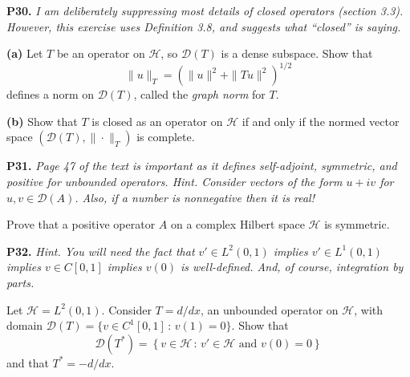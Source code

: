 \documentclass[12pt]{amsart}
\newcommand{\cD}{\mathcal{D}}
\newcommand{\cH}{\mathcal{H}}
\newcommand{\prob}[1]{\bigskip\noindent\textbf{#1.}\quad }
\newcommand{\epart}[1]{\medskip\noindent\textbf{(#1)}\quad }
\begin{document}
\prob{P30} \emph{I am deliberately suppressing most details of \emph{closed} operators (section 3.3).  However, this exercise uses Definition 3.8, and suggests what ``closed'' is saying.}

\epart{a} Let $T$ be an operator on $\cH$, so $\cD(T)$ is a dense subspace.  Show that
	$$\|u\|_T = \left(\|u\|^2 + \|Tu\|^2\right)^{1/2}$$
defines a norm on $\cD(T)$, called the \emph{graph norm} for $T$.

\epart{b} Show that $T$ is closed as an operator on $\cH$ if and only if the normed vector space $(\cD(T),\|\cdot\|_T)$ is complete.


\clearpage\newpage
\prob{P31} \emph{Page 47 of the text is important as it defines \emph{self-adjoint}, \emph{symmetric}, and \emph{positive} for unbounded operators.  Hint. Consider vectors of the form $u+iv$ for $u,v\in\cD(A)$.  Also, if a number is nonnegative then it is real!}

\medskip\noindent Prove that a positive operator $A$ on a complex Hilbert space $\cH$ is symmetric.


\prob{P32}  \emph{Hint.  You will need the fact that $v' \in L^2(0,1)$ implies $v' \in L^1(0,1)$ implies $v \in C[0,1]$ implies $v(0)$ is well-defined.  And, of course, integration by parts.}

\medskip\noindent Let $\cH=L^2(0,1)$.  Consider $T=d/dx$, an unbounded operator on $\cH$, with domain $\cD(T) = \{v\in C^1[0,1]\,:\,v(1)=0\}$.  Show that
    $$\cD(T^*) = \left\{v\in \cH\,:\,v'\in\cH \text{ and } v(0)=0\right\}$$
and that $T^*=-d/dx$.
\end{document}
